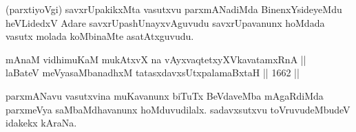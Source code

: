 \begin{artha}
(parxtiyoVgi) savxrUpakikxMta vasutxvu parxmANadiMda BinenxYsideyeMdu heVLidedxV Adare savxrUpashUnayxvAguvudu savxrUpavanunx hoMdada vasutx molada koMbinaMte asatAtxguvudu.
\end{artha}


\begin{shl}
mAnaM vidhimuKaM mukAtxvX na vAyxvaqtetxyXVkavatamxRnA || \\
laBateV meVyasaMbanadhxM tatasxdavxsUtxpalamaBxtaH \hfill || 1662 ||  
\end{shl}

\begin{artha}
parxmANavu vasutxvina muKavanunx biTuTx BeVdaveMba mAgaRdiMda parxmeVya saMbaMdhavanunx hoMduvudilalx. sadavxsutxvu toVruvudeMbudeV idakekx kAraNa.
\end{artha} 



